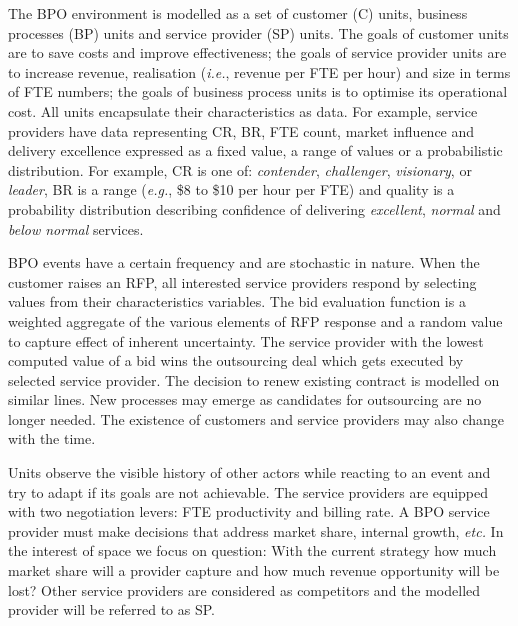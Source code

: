 \documentclass[10pt,numbers]{sigplanconf}
\begin{document}
The BPO environment is modelled as a set of customer (C) units, business processes (BP) units and service provider (SP) units. The goals of customer units are to save costs and improve effectiveness; the goals of service provider units are to increase revenue, realisation ({\it i.e.}, revenue per FTE per hour) and size in terms of FTE numbers; the goals of business process units is to optimise its operational cost.
%
All units encapsulate their characteristics as data. For example, service providers have data representing CR, BR, FTE count, market influence and delivery excellence expressed as a fixed value, a range of values or a probabilistic distribution. For example, CR is one of: {\it contender}, {\it challenger}, {\it visionary}, or {\it  leader}, BR is a range ({\it e.g.}, \$8  to \$10 per hour per FTE) and quality is a probability distribution describing confidence of delivering {\it excellent}, {\it normal} and {\it below normal} services. 

BPO events have a certain frequency and are stochastic in nature. When the customer raises an RFP, all interested service providers respond by selecting values from their characteristics variables. The bid evaluation function is a weighted aggregate of the various elements of RFP response and a random value to capture effect of inherent uncertainty. The service provider with the lowest computed value of a bid wins the outsourcing deal which gets executed by selected service provider. The decision to renew existing contract is modelled on similar lines. New processes may emerge as candidates for outsourcing are no longer needed. The existence of customers and service providers may also change with the time.
 
Units observe the visible history of other actors while reacting to an event and try to adapt if its goals are not achievable. The service providers are equipped with two negotiation levers: FTE productivity and billing rate. A BPO service provider must make decisions that address market share, internal growth, {\it etc.} In the interest of space we focus on question: With the current strategy how much market share will a provider capture and how much revenue opportunity will be lost? Other service providers are considered as competitors and the modelled provider will be referred to as SP. 
\end{document}
